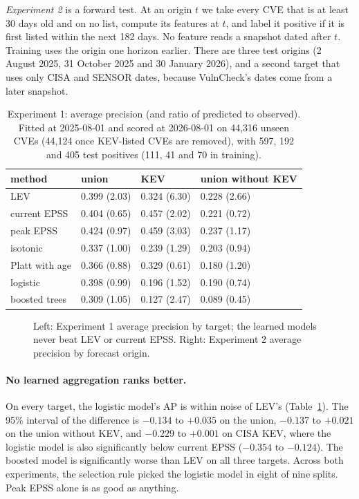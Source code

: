\emph{Experiment 2} is a forward test. At an origin $t$ we take every CVE that
is at least 30 days old and on no list, compute its features at $t$, and label
it positive if it is first listed within the next 182 days. No feature reads
a snapshot dated after $t$. Training uses the
origin one horizon earlier. There are three test origins (2 August 2025,
31 October 2025 and 30 January 2026), and a second target that uses only CISA
and SENSOR dates, because VulnCheck's dates come from a later snapshot.

\begin{table}[t]
\centering\small
\caption{Experiment 1: average precision (and ratio of predicted to observed).
Fitted at 2025-08-01 and scored at 2026-08-01 on 44,316 unseen CVEs (44,124
once KEV-listed CVEs are removed), with 597, 192 and 405 test positives (111,
41 and 70 in training).}\label{tab:a1}
\begin{tabular}{@{}llll@{}}
\toprule
method & union & KEV & union without KEV \\
\midrule
LEV & 0.399 (2.03\x) & 0.324 (6.30\x) & 0.228 (2.66\x) \\
current EPSS & 0.404 (0.65\x) & 0.457 (2.02\x) & 0.221 (0.72\x) \\
peak EPSS & 0.424 (0.97\x) & 0.459 (3.03\x) & 0.237 (1.17\x) \\
isotonic & 0.337 (1.00\x) & 0.239 (1.29\x) & 0.203 (0.94\x) \\
Platt with age & 0.366 (0.88\x) & 0.329 (0.61\x) & 0.180 (1.20\x) \\
logistic & 0.398 (0.99\x) & 0.196 (1.52\x) & 0.190 (0.74\x) \\
boosted trees & 0.309 (1.05\x) & 0.127 (2.47\x) & 0.089 (0.45\x) \\
\bottomrule
\end{tabular}
\end{table}

\begin{figure}[tb]
\centering
{}
\caption{Left: Experiment 1 average precision by target; the learned models
never beat LEV or current EPSS. Right: Experiment 2 average precision by
forecast origin.}\label{fig:learned}
\end{figure}

\paragraph{No learned aggregation ranks better.} On every target, the logistic
model's AP is within noise of LEV's (Table~\ref{tab:a1}). The 95\% interval of
the difference is $-0.134$ to $+0.035$ on the union, $-0.137$ to $+0.021$ on
the union without KEV, and $-0.229$ to $+0.001$ on CISA KEV, where the logistic
model is also significantly below current EPSS ($-0.354$ to $-0.124$). The
boosted model is significantly worse than LEV on all three targets. Across
both experiments, the selection rule picked the logistic model in eight of nine
splits. Peak EPSS alone is as good as anything.

